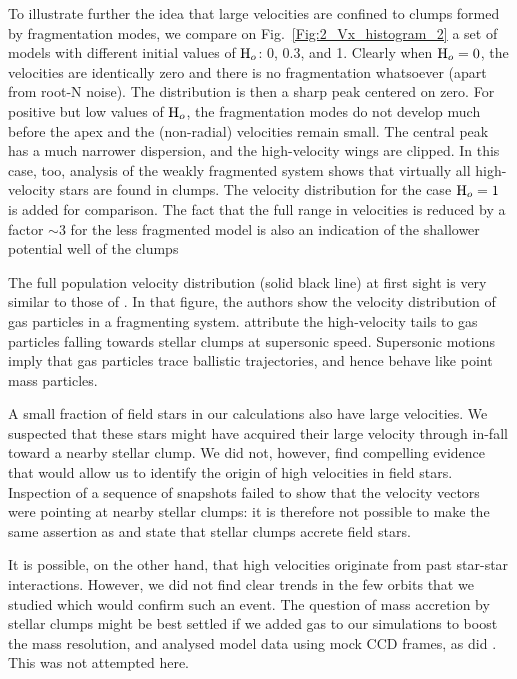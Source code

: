 To illustrate further the idea that large velocities are confined to clumps formed by fragmentation modes, we compare on Fig.~\ref{Fig:2_Vx_histogram_2} a set of models 
with different initial  values of  ${\textrm{H}}_o$: 0, 0.3, and 1. 
Clearly when ${\textrm{H}}_o=0$, the velocities are identically zero and there is no fragmentation whatsoever (apart from root-N noise). The distribution is then a sharp peak centered on zero. For positive but low values of ${\textrm{H}}_o$, the fragmentation modes do not develop much before the apex and the (non-radial) velocities remain small. The central peak  has a much narrower dispersion, and the high-velocity wings are clipped. In this case, too, analysis of the  weakly fragmented system shows that virtually all high-velocity stars are found in clumps. The velocity distribution for the case  ${\textrm{H}}_o = 1$ is added for comparison. The fact that the full range in velocities is reduced by a factor $\sim 3$ for the 
less fragmented model is also an indication of the shallower potential well of the clumps

The full population velocity distribution (solid black line) at first sight is very similar to those of \citet[Fig.~5]{Klessen2000}. In that figure, the authors show the velocity distribution of gas particles in a fragmenting system. \citeauthor{Klessen2000} attribute the high-velocity tails to gas particles falling towards stellar clumps at supersonic speed. Supersonic motions imply that gas particles trace ballistic trajectories, and hence behave like point mass particles. 

A small fraction of field stars in our calculations also have large velocities. We suspected that these stars might have acquired their large velocity through in-fall toward a nearby stellar clump. We did not, however,  find compelling evidence that would allow us to identify the origin of high velocities in field stars. Inspection of a sequence of snapshots failed to show that the velocity vectors were pointing at nearby stellar clumps: it is therefore not possible to make the same assertion as \citeauthor{Klessen2000} and state that stellar clumps accrete field stars.

It is possible, on the other hand,  that high velocities originate from past star-star interactions. However, we did not find clear trends in the few orbits that we studied which would confirm such an event. The question of mass accretion by stellar clumps might be best settled if we added gas to our simulations to boost the mass resolution, and analysed model data using mock CCD frames, as did \citeauthor{Klessen2000}. This was not attempted here.

